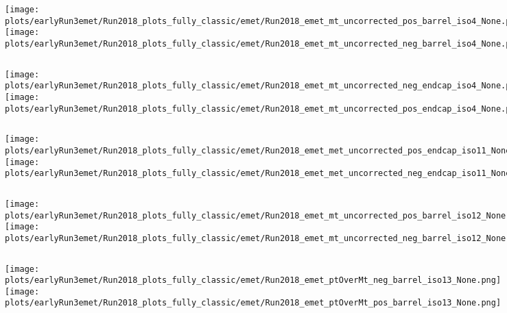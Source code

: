 \documentclass[en,16:9,navbarinfooter]{presentation/sdqbeamer}
\begin{document}
\begin{frame}{\insertsubsection}
   \begin{columns}
   \texttt{[image: plots/earlyRun3emet/Run2018\_plots\_fully\_classic/emet/Run2018\_emet\_mt\_uncorrected\_pos\_barrel\_iso4\_None.png]}
   \texttt{[image: plots/earlyRun3emet/Run2018\_plots\_fully\_classic/emet/Run2018\_emet\_mt\_uncorrected\_neg\_barrel\_iso4\_None.png]}
\end{columns}
\end{frame}

\begin{frame}{\insertsubsection}
   \begin{columns}
   \texttt{[image: plots/earlyRun3emet/Run2018\_plots\_fully\_classic/emet/Run2018\_emet\_mt\_uncorrected\_neg\_endcap\_iso4\_None.png]}
   \texttt{[image: plots/earlyRun3emet/Run2018\_plots\_fully\_classic/emet/Run2018\_emet\_mt\_uncorrected\_pos\_endcap\_iso4\_None.png]}
\end{columns}
\end{frame}

\begin{frame}{\insertsubsection}
   \begin{columns}
   \texttt{[image: plots/earlyRun3emet/Run2018\_plots\_fully\_classic/emet/Run2018\_emet\_met\_uncorrected\_pos\_endcap\_iso11\_None.png]}
   \texttt{[image: plots/earlyRun3emet/Run2018\_plots\_fully\_classic/emet/Run2018\_emet\_met\_uncorrected\_neg\_endcap\_iso11\_None.png]}
\end{columns}
\end{frame}

\begin{frame}{\insertsubsection}
   \begin{columns}
   \texttt{[image: plots/earlyRun3emet/Run2018\_plots\_fully\_classic/emet/Run2018\_emet\_mt\_uncorrected\_pos\_barrel\_iso12\_None.png]}
   \texttt{[image: plots/earlyRun3emet/Run2018\_plots\_fully\_classic/emet/Run2018\_emet\_mt\_uncorrected\_neg\_barrel\_iso12\_None.png]}
\end{columns}
\end{frame}

\begin{frame}{\insertsubsection}
   \begin{columns}
   \texttt{[image: plots/earlyRun3emet/Run2018\_plots\_fully\_classic/emet/Run2018\_emet\_ptOverMt\_neg\_barrel\_iso13\_None.png]}
   \texttt{[image: plots/earlyRun3emet/Run2018\_plots\_fully\_classic/emet/Run2018\_emet\_ptOverMt\_pos\_barrel\_iso13\_None.png]}
\end{columns}
\end{frame}
\end{document}
